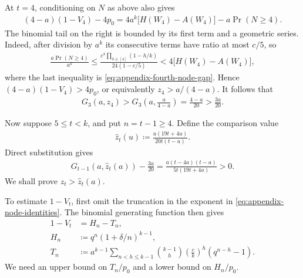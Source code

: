 At $t=4$, conditioning on $N$ as above also gives
\begin{align*}
(4-a)(1-V_4)-4p_0
=4a^k\bigl[H(W_4)-A(W_4)\bigr]-a\Pr(N\ge4).
\end{align*}
The binomial tail on the right is bounded by its first term and a geometric series. Indeed, after division by $a^k$ its consecutive terms have ratio at most $c/5$, so
\begin{align*}
\frac{a\Pr(N\ge4)}{a^k}
\le\frac{c^4\prod_{h\in[4]}(1-h/k)}{24(1-c/5)}
<4\bigl[H(W_4)-A(W_4)\bigr],
\end{align*}
where the last inequality is \cref{eq:appendix-fourth-node-gap}. Hence $(4-a)(1-V_4)>4p_0$, or equivalently $z_4>a/(4-a)$. It follows that
\begin{align*}
G_3(a,z_4)>G_3\left(a,\frac{a}{4-a}\right)=\frac{4-a}{20}>\frac{3a}{20}.
\end{align*}

Now suppose $5\le t<k$, and put $n=t-1\ge4$. Define the comparison value
\begin{align*}
\widehat z_t(u)\coloneqq\frac{u(19t+4u)}{20t(t-u)}.
\end{align*}
Direct substitution gives
\begin{align}\label{eq:appendix-zhat}
G_{t-1}(a,\widehat z_t(a))-\frac{3a}{20}
=\frac{a(t-4a)(t-a)}{5t(19t+4a)}>0.
\end{align}
We shall prove $z_t>\widehat z_t(a)$.

To estimate $1-V_t$, first omit the truncation in the exponent in \cref{eq:appendix-node-identities}. The binomial generating function then gives
\begin{align}\label{eq:appendix-untruncated-tail}
1-V_t&=H_n-T_n,\\
H_n&\coloneqq q^n(1+\delta/n)^{k-1},\nonumber\\
T_n&\coloneqq a^{k-1}\sum_{n<h\le k-1}\binom{k-1}{h}
\left(\frac ck\right)^h(q^{n-h}-1).\nonumber
\end{align}
We need an upper bound on $T_n/p_0$ and a lower bound on $H_n/p_0$.

